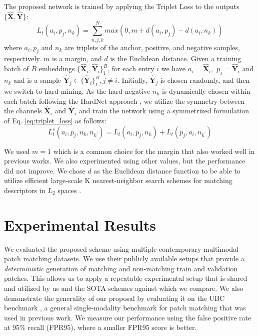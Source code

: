 \documentclass[10pt,journal]{IEEEtran}\usepackage{amsfonts}
\begin{document}
\label{subsec:symmetric triplett}

The proposed network is trained by applying the Triplet Loss \cite {FaceNetTripletLoss} to the outputs $\{\mathbf{\widehat{X}},\mathbf{\widehat{Y}}\}$:\begin{equation}
L_{t}\left( a_{i},p_{j},n_{k}\right)
=\sum_{n,j,k}^{N}max(0,m+d(a_{i},p_{j})-d(a_{i},n_{k}))
\label{eq:triplet_loss}
\end{equation}where $a_{i},p_{j}$ and $n_{k}$ are triplets of the anchor, positive, and
negative samples, respectively. $m$ is a margin, and $d$ is the Euclidean
distance. Given a training batch of $B$ embeddings $\{\mathbf{\widehat{X}}_{i},\mathbf{\widehat{Y}}_{i}\}_{1}^{B}$, for each entry $i$ we have $a_{i}=\mathbf{\widehat{X}}_{i},$ $p_{j}=\mathbf{\widehat{Y}}_{i}$ and $n_{k}$ and
is a sample $\mathbf{\widehat{Y}}_{j}\in \{\mathbf{\widehat{Y}}_{i}\}_{1}^{B},j\neq i$. Initially, $\mathbf{\widehat{Y}}_{j}$ is chosen
randomly, and then we switch to hard mining. As the hard negative $n_{k}$ is
dynamically chosen within each batch following the HardNet approach \cite {HardNet}, we utilize the symmetry between the channels $\mathbf{\widehat{X}}_{i}$ and $\mathbf{\widehat{Y}}_{i}$ and train the network using a
symmetrized formulation of Eq. \ref{eq:triplet_loss} as follows:\begin{equation}
L_{t}^{s}\left( a_{i},p_{j},n_{k},n_{k^{\prime }}\right) =L_{t}\left(
a_{i},p_{j},n_{k}\right) +L_{t}\left( p_{j},a_{i},n_{k^{\prime }}\right)
\label{eq:symm triplet_loss}
\end{equation}

We used $m=1$ which is a common choice for the margin that also worked well
in previous works. We also experimented using other values, but the
performance did not improve. We chose $d$ as the Euclidean distance function
to be able to utilize efficient large-scale K nearest-neighbor search
schemes for matching descriptors in $L_{2}$ spaces \cite{LSH}.

\section{Experimental Results}

\label{sec:experimental}

We evaluated the proposed scheme using multiple contemporary multimodal
patch matching datasets. We use their publicly available setups that provide
a \textit{deterministic }generation of matching and non-matching train and
validation patches. This allows us to apply a repeatable experimental setup
that is shared and utilized by us and the SOTA schemes against which we
compare. We also demonstrate the generality of our proposal by evaluating it
on the UBC benchmark \cite{UBC_benchmark}, a general single-modality
benchmark for patch matching that was used in previous work. We measure our
performance using the false positive rate at 95\% recall (FPR95), where a
smaller FPR95 score is better.
\end{document}

